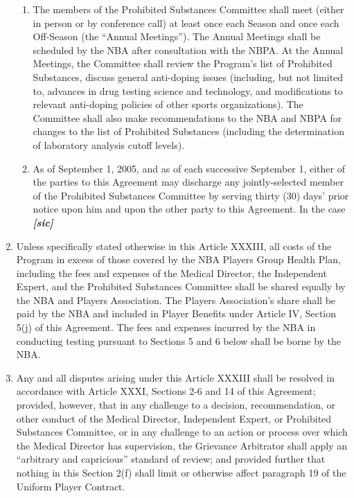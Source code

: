 \documentclass[
]{book}
\begin{document}
\begin{enumerate}
\begin{enumerate}
  \item
    The members of the Prohibited Substances Committee shall meet (either in person or by conference call) at least once each Season and once each Off-Season (the ``Annual Meetings''). The Annual Meetings shall be scheduled by the NBA after consultation with the NBPA. At the Annual Meetings, the Committee shall review the Program's list of Prohibited Substances, discuss general anti-doping issues (including, but not limited to, advances in drug testing science and technology, and modifications to relevant anti-doping policies of other sports organizations). The Committee shall also make recommendations to the NBA and NBPA for changes to the list of Prohibited Substances (including the determination of laboratory analysis cutoff levels).
  \item
    As of September 1, 2005, and as of each successive September 1, either of the parties to this Agreement may discharge any jointly-selected member of the Prohibited Substances Committee by serving thirty (30) days' prior notice upon him and upon the other party to this Agreement. In the case \textbf{\emph{{[}sic{]}}}
  \end{enumerate}
\item
  Unless specifically stated otherwise in this Article XXXIII, all costs of the Program in excess of those covered by the NBA Players Group Health Plan, including the fees and expenses of the Medical Director, the Independent Expert, and the Prohibited Substances Committee shall be shared equally by the NBA and Players Association. The Players Association's share shall be paid by the NBA and included in Player Benefits under Article IV, Section 5(j) of this Agreement. The fees and expenses incurred by the NBA in conducting testing pursuant to Sections 5 and 6 below shall be borne by the NBA.
\item
  Any and all disputes arising under this Article XXXIII shall be resolved in accordance with Article XXXI, Sections 2-6 and 14 of this Agreement; provided, however, that in any challenge to a decision, recommendation, or other conduct of the Medical Director, Independent Expert, or Prohibited Substances Committee, or in any challenge to an action or process over which the Medical Director has supervision, the Grievance Arbitrator shall apply an ``arbitrary and capricious'' standard of review; and provided further that nothing in this Section 2(f) shall limit or otherwise affect paragraph 19 of the Uniform Player Contract.
\end{enumerate}
\end{document}
